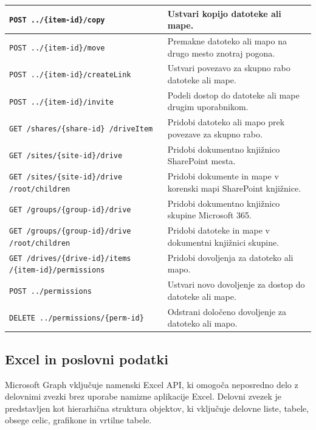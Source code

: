 \documentclass[a4paper, 12pt]{book}
\begin{document}
\begin{longtable}{|p{5.5cm}|p{8.5cm}|}
\texttt{POST ../\{item-id\}/copy} &
Ustvari kopijo datoteke ali mape. \\
\hline

\texttt{POST ../\{item-id\}/move} &
Premakne datoteko ali mapo na drugo mesto znotraj pogona. \\
\hline

\texttt{POST ../\{item-id\}/createLink} &
Ustvari povezavo za skupno rabo datoteke ali mape. \\
\hline

\texttt{POST ../\{item-id\}/invite} &
Podeli dostop do datoteke ali mape drugim uporabnikom. \\
\hline

\texttt{GET /shares/\{share-id\}
/driveItem} &
Pridobi datoteko ali mapo prek povezave za skupno rabo. \\
\hline

\texttt{GET /sites/\{site-id\}/drive} &
Pridobi dokumentno knjižnico SharePoint mesta. \\
\hline

\texttt{GET /sites/\{site-id\}/drive
/root/children} &
Pridobi dokumente in mape v korenski mapi SharePoint knjižnice. \\
\hline

\texttt{GET /groups/\{group-id\}/drive} &
Pridobi dokumentno knjižnico skupine Microsoft 365. \\
\hline

\texttt{GET /groups/\{group-id\}/drive
/root/children} &
Pridobi datoteke in mape v dokumentni knjižnici skupine. \\
\hline

\texttt{GET /drives/\{drive-id\}/items
/\{item-id\}/permissions} &
Pridobi dovoljenja za datoteko ali mapo. \\
\hline

\texttt{POST ../permissions} &
Ustvari novo dovoljenje za dostop do datoteke ali mape. \\
\hline

\texttt{DELETE ../permissions/\{perm-id\}} &
Odstrani določeno dovoljenje za datoteko ali mapo. \\
\hline

\end{longtable}

\subsection{Excel in poslovni podatki}

Microsoft Graph vključuje namenski Excel API, ki omogoča neposredno delo z delovnimi zvezki brez uporabe namizne aplikacije Excel. Delovni zvezek je predstavljen kot hierarhična struktura objektov, ki vključuje delovne liste, tabele, obsege celic, grafikone in vrtilne tabele.
\end{document}
